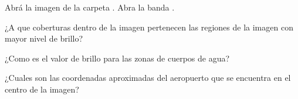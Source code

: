 Abrá la imagen  de la  carpeta . Abra la banda .

\begin{que}
    ¿A que coberturas dentro de la imagen pertenecen las regiones de la imagen con mayor nivel de brillo?
\end{que}

\begin{que}
    ¿Como es el valor de brillo para las zonas de cuerpos de agua?
\end{que}

\begin{que}
    ¿Cuales son las coordenadas aproximadas del aeropuerto que se encuentra en el centro de la imagen?
\end{que}
